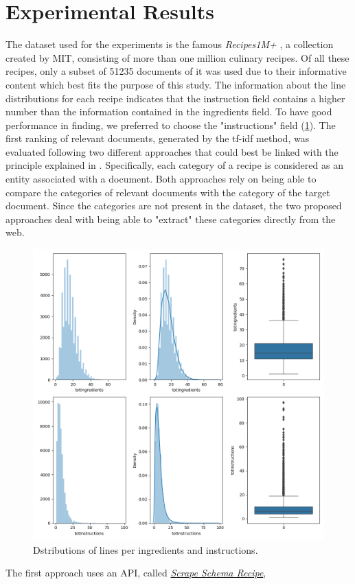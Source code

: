 \section*{Experimental Results}

The dataset used for the experiments is the famous \emph{Recipes1M+} \cite{15}, a collection 
created by MIT, consisting of more than one million culinary recipes. 
Of all these recipes, only a subset of 51235 documents of it was used due 
to their informative content which best fits the purpose of this study. The 
information about the line distributions for each recipe indicates that the 
instruction field contains a higher number than the information contained in 
the ingredients field. To have good performance in finding, we preferred to 
choose the "instructions" field (\ref{distributions}). The first ranking of relevant documents, 
generated by the tf-idf method, was evaluated following two different 
approaches that could best be linked with the principle explained in \cite{16}. 
Specifically, each category of a recipe is considered as an entity associated 
with a document. Both approaches rely on being able to compare the categories of relevant documents 
with the category of the target document. Since the categories are not present in the dataset, the 
two proposed approaches deal with being able to "extract" these categories directly from the web. 
\begin{figure}[h!]
    \centering
    \includegraphics[width = 0.7 \linewidth]{images/displot.png}
    \centering
    \caption{Dstributions of lines per ingredients and instructions.}
    \label{distributions}
\end{figure}
The first approach uses an API, called \href{https://pypi.org/project/scrape-schema-recipe/}{\emph{Scrape Schema Recipe}}, 
